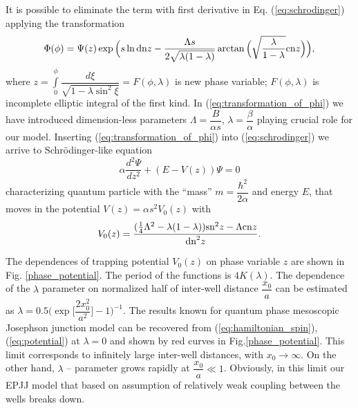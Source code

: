 \documentclass[aps, pre, preprint, groupedaddress, superscriptaddress, showkeys, showpacs] {revtex4-1}
\begin{document}
%
It is possible to eliminate the term with first derivative in Eq. (\ref{eq:schrodinger}) applying the transformation
%
\begin{equation}
\Phi(\phi) = \Psi(z) \exp \Big( s \ln \textrm{dn}{z} - \dfrac{\Lambda s}{2 \sqrt{\lambda (1 - \lambda)}} \arctan \Big( \sqrt{\dfrac{\lambda}{1 - \lambda}} \textrm{cn}{z} \Big) \Big),
\label{eq:transformation_of_phi}
\end{equation}
%
where $z = \int \limits_0^\phi \dfrac{d \xi}{\sqrt{1 - \lambda \sin^2 \xi}} = F(\phi, \lambda)$ is new phase variable; $F(\phi, \lambda)$ is incomplete elliptic integral of the first kind.
In (\ref{eq:transformation_of_phi}) we have introduced dimension-less parameters $\Lambda = \dfrac{B}{\alpha s}$, $\lambda = \dfrac{\beta}{\alpha}$ playing crucial role for our model.
Inserting (\ref{eq:transformation_of_phi}) into (\ref{eq:schrodinger}) we arrive to Schr\"odinger-like equation
% 
\begin{equation}
\alpha \frac{d^2\Psi}{dz^2} + (E - V(z))\Psi = 0
\label{eq:schrodinger_usual}
\end{equation}
%
characterizing quantum particle with the ``mass''  $m = \dfrac{\hbar^2}{2 \alpha}$ and energy $E$, that moves in the potential $V(z) = \alpha s^2 V_0(z)$ with
%
\begin{equation}
V_0(z) = \frac{ (\frac{1}{4} \Lambda^2 - \lambda (1 - \lambda)) \textrm{sn}^2{z} - \Lambda \textrm{cn}{z}}{\textrm{dn}^2{z}}.
\label{eq:potential}
\end{equation}
%

The dependences of trapping potential $V_0(z)$ on phase variable $z$ are shown in Fig. \ref{phase_potential}. The period of the functions is  $4K(\lambda)$.
The dependence of the $\lambda$ parameter on normalized half of inter-well distance $\dfrac{x_0}{a}$ can be estimated as $\lambda = 0.5 \Big( \exp \Big[ \dfrac{2 x_0^2}{a^2} \Big] - 1 \Big)^{-1}$. The results known for quantum phase mesoscopic Josephson junction model can be recovered from (\ref{eq:hamiltonian_spin}), (\ref{eq:potential}) at $\lambda = 0$ and shown by red curves in  Fig.\ref{phase_potential}. This limit corresponds to  infinitely large inter-well distances, with $x_0 \to \infty$.
On the other hand, $\lambda$ -- parameter grows rapidly at $\dfrac{x_0}{a} \ll 1$.
Obviously, in this limit our EPJJ model that based on assumption of relatively weak coupling between the wells breaks down.
\end{document}
